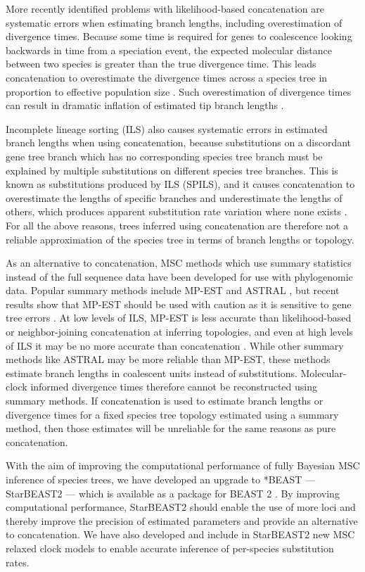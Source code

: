 \documentclass[12pt]{article}
\begin{document}
More recently identified problems with likelihood-based concatenation are systematic errors when
estimating branch lengths, including overestimation of divergence times. Because
some time is required for genes to coalescence looking backwards in time from
a speciation event, the expected molecular distance between two species is
greater than the true divergence time. This leads concatenation to overestimate
the divergence times across a species tree in proportion to effective population size
\citep{Angelis874}. Such overestimation of divergence times can result in dramatic
inflation of estimated tip branch lengths \citep{Ogilvie01052016}.

Incomplete lineage sorting (ILS) also causes systematic errors in estimated
branch lengths when using concatenation, because substitutions on a discordant gene tree branch
which has no corresponding species tree branch must be explained by multiple
substitutions on different species tree branches. This is known as substitutions
produced by ILS (SPILS), and it causes concatenation to overestimate the lengths of specific
branches and underestimate the lengths of others, which produces apparent
substitution rate variation where none exists \citep{Mendes01072016}. For all
the above reasons, trees
inferred using concatenation are therefore not a reliable approximation of the
species tree in terms of branch lengths or topology.

As an alternative to concatenation, MSC methods which use summary statistics instead
of the full sequence data have been developed for use with phylogenomic data.
Popular summary methods include MP-EST and ASTRAL \citep{Liu2010,
Mirarab01092014}, but recent results show that MP-EST should be used with caution as it is
sensitive to gene tree errors \citep{Mirarab15062015, Xi201563}. At low levels of
ILS, MP-EST is less accurate than likelihood-based or neighbor-joining concatenation at
inferring topologies, and even at high levels of ILS it may be no more accurate
than concatenation \citep{Ogilvie01052016}. While other summary methods like
ASTRAL may be more reliable than MP-EST, these methods estimate branch lengths
in coalescent units instead of substitutions. Molecular-clock informed divergence times therefore cannot be
reconstructed using summary methods. If concatenation is used to estimate branch
lengths or divergence times for a fixed species tree
topology estimated using a summary method, then those estimates will be
unreliable for the same reasons as pure concatenation.

With the aim of improving the computational performance of fully Bayesian
MSC inference of species trees, we have developed an upgrade
to *BEAST --- StarBEAST2 --- which is available as a package for BEAST 2
\citep{10.1371/journal.pcbi.1003537}. By improving computational performance,
StarBEAST2 should enable the use of more loci and thereby improve the precision
of estimated parameters and provide an alternative to concatenation. We have
also developed and include in StarBEAST2 new MSC relaxed
clock models to enable accurate inference of per-species substitution rates.
\end{document}
